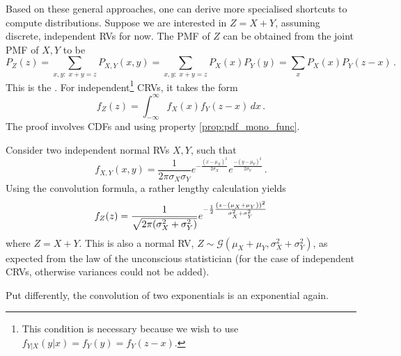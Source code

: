 Based on these general approaches, one can derive more specialised shortcuts to compute distributions. Suppose we are interested in $Z = X + Y$, assuming discrete, independent RVs for now. The PMF of $Z$ can be obtained from the joint PMF of $X, Y$ to be
\begin{equation}
P_Z(z) = \sum_{x, y: \; x + y = z} P_{X, Y}(x, y) = \sum_{x, y: \; x + y = z} P_X(x) P_Y(y) = \sum_x P_X(x) P_Y(z - x) \, .%
\end{equation}
This is the . For independent\footnote{This condition is necessary because we wish to use $f_{Y | X}(y | x) = f_Y(y) = f_Y(z - x)$.} CRVs, it takes the form
\begin{equation}
f_Z(z) = \int_{- \infty}^\infty f_X(x) f_Y(z - x) \, dx \, .
\end{equation}
The proof involves CDFs and using property \ref{prop:pdf_mono_func}.










\begin{ex}
Consider two independent normal RVs $X, Y$, such that
\begin{equation*}
f_{X, Y}(x, y) = \frac{1}{2\pi \sigma_X \sigma_Y} e^{- \frac{(x - \mu_X)^2}{2 \sigma_X}} e^{\frac{- (y - \mu_Y)^2}{2 \sigma_Y}} \, .
\end{equation*}
Using the convolution formula, a rather lengthy calculation yields
\begin{equation}
f_Z(z) = \frac{1}{\sqrt{2 \pi \qty(\sigma_X^2 + \sigma_Y^2)}} e^{- \frac{1}{2} \frac{\qty(z - \qty(\mu_X + \mu_Y))^2}{\sigma_X^2 + \sigma_Y^2}}
\end{equation}
where $Z = X + Y$. This is also a normal RV, $Z \sim \mathcal{G}(\mu_X + \mu_Y, \sigma_X^2 + \sigma_Y^2)$, as expected from the law of the unconscious statistician (for the case of independent CRVs, otherwise variances could not be added).

Put differently, the convolution of two exponentials is an exponential again.
\end{ex}


